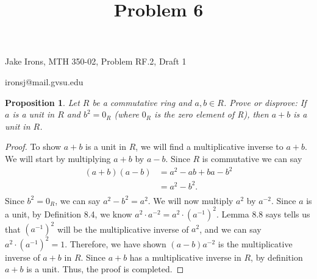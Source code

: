 \documentclass[11 pt]{article}
\title{Problem 6}
\newtheorem{proposition}{Proposition}
\newcommand{\newpar}{\vspace{.15in}\noindent}
\begin{document}
\noindent Jake Irons, MTH 350-02, Problem RF.2, Draft 1

\noindent ironsj@mail.gvsu.edu

\newpar
\begin{proposition}
Let $R$ be a commutative ring and $a, b \in R$. Prove or disprove: If $a$ is a unit in $R$ and $b^2=0_R$ (where $0_R$ is the zero element of R), then $a + b$ is a unit in $R$.

\end{proposition}
\begin{proof}
To show $a+b$ is a unit in $R$, we will find a multiplicative inverse to $a+b$. We will start by multiplying $a+b$ by $a-b$. Since $R$ is commutative we can say
\begin{align*}
(a+b)(a-b)&=a^2-ab+ba-b^2 \\
&=a^2-b^2. \\
\end{align*}
\noindent
Since $b^2=0_R$, we can say $a^2-b^2=a^2$. We will now multiply $a^2$ by $a^{-2}$. Since $a$ is a unit, by Definition 8.4, we know $a^2\cdot a^{-2}=a^2\cdot (a^{-1})^2$. Lemma 8.8 says tells us that $(a^{-1})^2$ will be the multiplicative inverse of $a^2$, and we can say $a^2\cdot (a^{-1})^2=1$. Therefore, we have shown $(a-b)a^{-2}$ is the multiplicative inverse of $a+b$ in $R$. Since $a+b$ has a multiplicative inverse in $R$, by definition $a+b$ is a unit. Thus, the proof is completed.
\end{proof}
\end{document}
